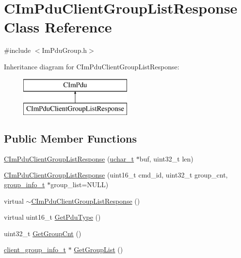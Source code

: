 \hypertarget{class_c_im_pdu_client_group_list_response}{}\section{C\+Im\+Pdu\+Client\+Group\+List\+Response Class Reference}
\label{class_c_im_pdu_client_group_list_response}


{\ttfamily \#include $<$Im\+Pdu\+Group.\+h$>$}

Inheritance diagram for C\+Im\+Pdu\+Client\+Group\+List\+Response\+:\begin{figure}[H]
\begin{center}
\leavevmode
\includegraphics[height=2.000000cm]{class_c_im_pdu_client_group_list_response}
\end{center}
\end{figure}
\subsection*{Public Member Functions}
\begin{DoxyCompactItemize}
\item 
\hyperlink{class_c_im_pdu_client_group_list_response_ae7a7354339de3b0c4c7c9c2da1406dcb}{C\+Im\+Pdu\+Client\+Group\+List\+Response} (\hyperlink{base_2ostype_8h_a124ea0f8f4a23a0a286b5582137f0b8d}{uchar\+\_\+t} $\ast$buf, uint32\+\_\+t len)
\item 
\hyperlink{class_c_im_pdu_client_group_list_response_aec076b828f6415862fe5796eacad7660}{C\+Im\+Pdu\+Client\+Group\+List\+Response} (uint16\+\_\+t cmd\+\_\+id, uint32\+\_\+t group\+\_\+cnt, \hyperlink{structgroup__info__t}{group\+\_\+info\+\_\+t} $\ast$group\+\_\+list=N\+U\+L\+L)
\item 
virtual \hyperlink{class_c_im_pdu_client_group_list_response_a754cfef2de0fe19f542992adf9ec117a}{$\sim$\+C\+Im\+Pdu\+Client\+Group\+List\+Response} ()
\item 
virtual uint16\+\_\+t \hyperlink{class_c_im_pdu_client_group_list_response_a730bc119409b7e55c7d1ea64c06fd84c}{Get\+Pdu\+Type} ()
\item 
uint32\+\_\+t \hyperlink{class_c_im_pdu_client_group_list_response_ab9ad7ad413c82ce50c2ef6066661ca4b}{Get\+Group\+Cnt} ()
\item 
\hyperlink{structclient__group__info__t}{client\+\_\+group\+\_\+info\+\_\+t} $\ast$ \hyperlink{class_c_im_pdu_client_group_list_response_a393fb8074cdf2de511e615b91ca758b9}{Get\+Group\+List} ()
\end{DoxyCompactItemize}
